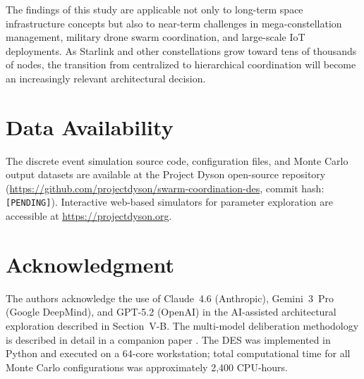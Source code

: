 \documentclass[journal]{IEEEtran}
\begin{document}
The findings of this study are applicable not only to long-term space infrastructure concepts but also to near-term challenges in mega-constellation management, military drone swarm coordination, and large-scale IoT deployments. As Starlink and other constellations grow toward tens of thousands of nodes, the transition from centralized to hierarchical coordination will become an increasingly relevant architectural decision.

\section*{Data Availability}

The discrete event simulation source code, configuration files, and Monte Carlo output datasets are available at the Project Dyson open-source repository (\url{https://github.com/projectdyson/swarm-coordination-des}, commit hash: \texttt{[PENDING]}). Interactive web-based simulators for parameter exploration are accessible at \url{https://projectdyson.org}.

\section*{Acknowledgment}

The authors acknowledge the use of Claude~4.6 (Anthropic), Gemini~3~Pro (Google DeepMind), and GPT-5.2 (OpenAI) in the AI-assisted architectural exploration described in Section~V-B. The multi-model deliberation methodology is described in detail in a companion paper \cite{dyson_multimodel}. The DES was implemented in Python and executed on a 64-core workstation; total computational time for all Monte Carlo configurations was approximately 2{,}400 CPU-hours.
\end{document}
